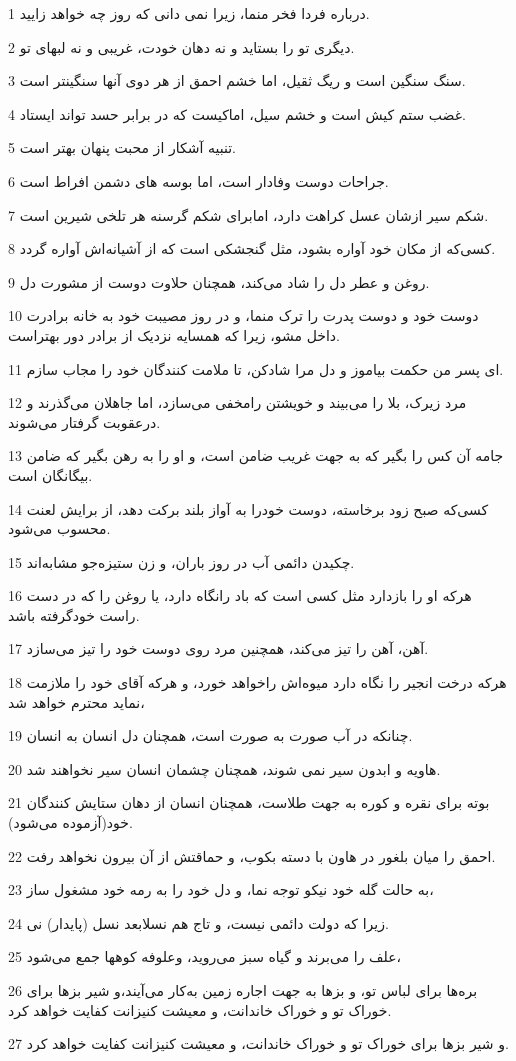 \par 1 درباره فردا فخر منما، زیرا نمی دانی که روز چه خواهد زایید.
\par 2 دیگری تو را بستاید و نه دهان خودت، غریبی و نه لبهای تو.
\par 3 سنگ سنگین است و ریگ ثقیل، اما خشم احمق از هر دوی آنها سنگینتر است.
\par 4 غضب ستم کیش است و خشم سیل، اماکیست که در برابر حسد تواند ایستاد.
\par 5 تنبیه آشکار از محبت پنهان بهتر است.
\par 6 جراحات دوست وفادار است، اما بوسه های دشمن افراط است.
\par 7 شکم سیر از‌شان عسل کراهت دارد، امابرای شکم گرسنه هر تلخی شیرین است.
\par 8 کسی‌که از مکان خود آواره بشود، مثل گنجشکی است که از آشیانه‌اش آواره گردد.
\par 9 روغن و عطر دل را شاد می‌کند، همچنان حلاوت دوست از مشورت دل.
\par 10 دوست خود و دوست پدرت را ترک منما، و در روز مصیبت خود به خانه برادرت داخل مشو، زیرا که همسایه نزدیک از برادر دور بهتراست.
\par 11 ‌ای پسر من حکمت بیاموز و دل مرا شادکن، تا ملامت کنندگان خود را مجاب سازم.
\par 12 مرد زیرک، بلا را می‌بیند و خویشتن رامخفی می‌سازد، اما جاهلان می‌گذرند و درعقوبت گرفتار می‌شوند.
\par 13 جامه آن کس را بگیر که به جهت غریب ضامن است، و او را به رهن بگیر که ضامن بیگانگان است.
\par 14 کسی‌که صبح زود برخاسته، دوست خودرا به آواز بلند برکت دهد، از برایش لعنت محسوب می‌شود.
\par 15 چکیدن دائمی آب در روز باران، و زن ستیزه‌جو مشابه‌اند.
\par 16 هرکه او را باز‌دارد مثل کسی است که باد رانگاه دارد، یا روغن را که در دست راست خودگرفته باشد.
\par 17 آهن، آهن را تیز می‌کند، همچنین مرد روی دوست خود را تیز می‌سازد.
\par 18 هر‌که درخت انجیر را نگاه دارد میوه‌اش راخواهد خورد، و هر‌که آقای خود را ملازمت نماید محترم خواهد شد،
\par 19 چنانکه در آب صورت به صورت است، همچنان دل انسان به انسان.
\par 20 هاویه و ابدون سیر نمی شوند، همچنان چشمان انسان سیر نخواهند شد.
\par 21 بوته برای نقره و کوره به جهت طلاست، همچنان انسان از دهان ستایش کنندگان خود(آزموده می‌شود).
\par 22 احمق را میان بلغور در هاون با دسته بکوب، و حماقتش از آن بیرون نخواهد رفت.
\par 23 به حالت گله خود نیکو توجه نما، و دل خود را به رمه خود مشغول ساز،
\par 24 زیرا که دولت دائمی نیست، و تاج هم نسلابعد نسل (پایدار) نی.
\par 25 علف را می‌برند و گیاه سبز می‌روید، وعلوفه کوهها جمع می‌شود،
\par 26 بره‌ها برای لباس تو، و بزها به جهت اجاره زمین به‌کار می‌آیند،و شیر بزها برای خوراک تو و خوراک خاندانت، و معیشت کنیزانت کفایت خواهد کرد.
\par 27 و شیر بزها برای خوراک تو و خوراک خاندانت، و معیشت کنیزانت کفایت خواهد کرد.
 
